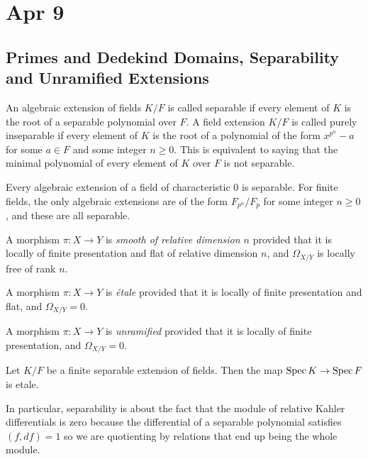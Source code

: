 \documentclass[12pt]{article}
\begin{document}
\section{Apr 9}
\subsection{Primes and Dedekind Domains, Separability and Unramified Extensions}
\begin{definition}
    An algebraic extension of fields $K/F$ is called separable if every element of $K$ is the root of a separable polynomial over $F$. A field extension $K/F$ is called purely inseparable if every element of $K$ is the root of a polynomial of the form $x^{p^n} - a$ for some $a \in F$ and some integer $n \geq 0$. This is equivalent to saying that the minimal polynomial of every element of $K$ over $F$ is not separable.
\end{definition}

\begin{example}
    Every algebraic extension of a field of characteristic $0$ is separable. 
    For finite fields, the only algebraic extensions are of the form $F_{p^n}/F_p$ for some integer $n \geq 0$, and these are all separable.
\end{example}

\begin{definition}
    A morphism $\pi : X \to Y$ is \emph{smooth of relative dimension $n$} provided that it is locally of finite presentation and flat of relative dimension $n$, and $\Omega_{X/Y}$ is locally free of rank $n$.
    
    A morphism $\pi : X \to Y$ is \emph{\'etale} provided that it is locally of finite presentation and flat, and $\Omega_{X/Y} = 0$.
    
    A morphism $\pi : X \to Y$ is \emph{unramified} provided that it is locally of finite presentation, and $\Omega_{X/Y} = 0$.
    \end{definition}

\begin{example}
    Let $K/F$ be a finite separable extension of fields. Then the map $\operatorname{Spec} K \to \operatorname{Spec} F$ is etale.
\end{example}

In particular, separability is about the fact that the module of relative Kahler differentials is zero because the differential of a separable polynomial satisfies $(f,df) = 1$ so we are quotienting by relations that end up being the whole module.
\end{document}
